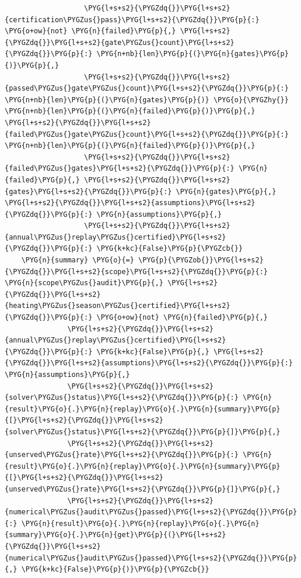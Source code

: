 \begin{Verbatim}
                   \PYG{l+s+s2}{\PYGZdq{}}\PYG{l+s+s2}{certification\PYGZus{}pass}\PYG{l+s+s2}{\PYGZdq{}}\PYG{p}{:} \PYG{o+ow}{not} \PYG{n}{failed}\PYG{p}{,} \PYG{l+s+s2}{\PYGZdq{}}\PYG{l+s+s2}{gate\PYGZus{}count}\PYG{l+s+s2}{\PYGZdq{}}\PYG{p}{:} \PYG{n+nb}{len}\PYG{p}{(}\PYG{n}{gates}\PYG{p}{)}\PYG{p}{,}
                   \PYG{l+s+s2}{\PYGZdq{}}\PYG{l+s+s2}{passed\PYGZus{}gate\PYGZus{}count}\PYG{l+s+s2}{\PYGZdq{}}\PYG{p}{:} \PYG{n+nb}{len}\PYG{p}{(}\PYG{n}{gates}\PYG{p}{)} \PYG{o}{\PYGZhy{}} \PYG{n+nb}{len}\PYG{p}{(}\PYG{n}{failed}\PYG{p}{)}\PYG{p}{,} \PYG{l+s+s2}{\PYGZdq{}}\PYG{l+s+s2}{failed\PYGZus{}gate\PYGZus{}count}\PYG{l+s+s2}{\PYGZdq{}}\PYG{p}{:} \PYG{n+nb}{len}\PYG{p}{(}\PYG{n}{failed}\PYG{p}{)}\PYG{p}{,}
                   \PYG{l+s+s2}{\PYGZdq{}}\PYG{l+s+s2}{failed\PYGZus{}gates}\PYG{l+s+s2}{\PYGZdq{}}\PYG{p}{:} \PYG{n}{failed}\PYG{p}{,} \PYG{l+s+s2}{\PYGZdq{}}\PYG{l+s+s2}{gates}\PYG{l+s+s2}{\PYGZdq{}}\PYG{p}{:} \PYG{n}{gates}\PYG{p}{,} \PYG{l+s+s2}{\PYGZdq{}}\PYG{l+s+s2}{assumptions}\PYG{l+s+s2}{\PYGZdq{}}\PYG{p}{:} \PYG{n}{assumptions}\PYG{p}{,}
                   \PYG{l+s+s2}{\PYGZdq{}}\PYG{l+s+s2}{annual\PYGZus{}replay\PYGZus{}certified}\PYG{l+s+s2}{\PYGZdq{}}\PYG{p}{:} \PYG{k+kc}{False}\PYG{p}{\PYGZcb{}}
    \PYG{n}{summary} \PYG{o}{=} \PYG{p}{\PYGZob{}}\PYG{l+s+s2}{\PYGZdq{}}\PYG{l+s+s2}{scope}\PYG{l+s+s2}{\PYGZdq{}}\PYG{p}{:} \PYG{n}{scope\PYGZus{}audit}\PYG{p}{,} \PYG{l+s+s2}{\PYGZdq{}}\PYG{l+s+s2}{heating\PYGZus{}season\PYGZus{}certified}\PYG{l+s+s2}{\PYGZdq{}}\PYG{p}{:} \PYG{o+ow}{not} \PYG{n}{failed}\PYG{p}{,}
               \PYG{l+s+s2}{\PYGZdq{}}\PYG{l+s+s2}{annual\PYGZus{}replay\PYGZus{}certified}\PYG{l+s+s2}{\PYGZdq{}}\PYG{p}{:} \PYG{k+kc}{False}\PYG{p}{,} \PYG{l+s+s2}{\PYGZdq{}}\PYG{l+s+s2}{assumptions}\PYG{l+s+s2}{\PYGZdq{}}\PYG{p}{:} \PYG{n}{assumptions}\PYG{p}{,}
               \PYG{l+s+s2}{\PYGZdq{}}\PYG{l+s+s2}{solver\PYGZus{}status}\PYG{l+s+s2}{\PYGZdq{}}\PYG{p}{:} \PYG{n}{result}\PYG{o}{.}\PYG{n}{replay}\PYG{o}{.}\PYG{n}{summary}\PYG{p}{[}\PYG{l+s+s2}{\PYGZdq{}}\PYG{l+s+s2}{solver\PYGZus{}status}\PYG{l+s+s2}{\PYGZdq{}}\PYG{p}{]}\PYG{p}{,}
               \PYG{l+s+s2}{\PYGZdq{}}\PYG{l+s+s2}{unserved\PYGZus{}rate}\PYG{l+s+s2}{\PYGZdq{}}\PYG{p}{:} \PYG{n}{result}\PYG{o}{.}\PYG{n}{replay}\PYG{o}{.}\PYG{n}{summary}\PYG{p}{[}\PYG{l+s+s2}{\PYGZdq{}}\PYG{l+s+s2}{unserved\PYGZus{}rate}\PYG{l+s+s2}{\PYGZdq{}}\PYG{p}{]}\PYG{p}{,}
               \PYG{l+s+s2}{\PYGZdq{}}\PYG{l+s+s2}{numerical\PYGZus{}audit\PYGZus{}passed}\PYG{l+s+s2}{\PYGZdq{}}\PYG{p}{:} \PYG{n}{result}\PYG{o}{.}\PYG{n}{replay}\PYG{o}{.}\PYG{n}{summary}\PYG{o}{.}\PYG{n}{get}\PYG{p}{(}\PYG{l+s+s2}{\PYGZdq{}}\PYG{l+s+s2}{numerical\PYGZus{}audit\PYGZus{}passed}\PYG{l+s+s2}{\PYGZdq{}}\PYG{p}{,} \PYG{k+kc}{False}\PYG{p}{)}\PYG{p}{\PYGZcb{}}

\end{Verbatim}
